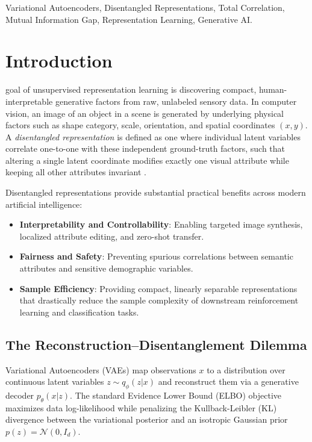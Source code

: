 \documentclass[10pt,journal,compsoc]{IEEEtran}
\begin{document}
{\begin{IEEEkeywords}
Variational Autoencoders, Disentangled Representations, Total Correlation, Mutual Information Gap, Representation Learning, Generative AI.
\end{IEEEkeywords}}

\maketitle
\IEEEdisplaynontitleabstractindextext
\IEEEpeerreviewmaketitle

\section{Introduction}
 goal of unsupervised representation learning is discovering compact, human-interpretable generative factors from raw, unlabeled sensory data. In computer vision, an image of an object in a scene is generated by underlying physical factors such as shape category, scale, orientation, and spatial coordinates $(x, y)$. A \textit{disentangled representation} is defined as one where individual latent variables correlate one-to-one with these independent ground-truth factors, such that altering a single latent coordinate modifies exactly one visual attribute while keeping all other attributes invariant \cite{higgins2017beta, chen2018isolating, locatello2019challenging}.

Disentangled representations provide substantial practical benefits across modern artificial intelligence:
\begin{itemize}
    \item \textbf{Interpretability and Controllability}: Enabling targeted image synthesis, localized attribute editing, and zero-shot transfer.
    \item \textbf{Fairness and Safety}: Preventing spurious correlations between semantic attributes and sensitive demographic variables.
    \item \textbf{Sample Efficiency}: Providing compact, linearly separable representations that drastically reduce the sample complexity of downstream reinforcement learning and classification tasks.
\end{itemize}

\subsection{The Reconstruction--Disentanglement Dilemma}
Variational Autoencoders (VAEs) \cite{kingma2013auto} map observations $x$ to a distribution over continuous latent variables $z \sim q_\phi(z|x)$ and reconstruct them via a generative decoder $p_\theta(x|z)$. The standard Evidence Lower Bound (ELBO) objective maximizes data log-likelihood while penalizing the Kullback-Leibler (KL) divergence between the variational posterior and an isotropic Gaussian prior $p(z) = \mathcal{N}(0, I_d)$.
\end{document}
